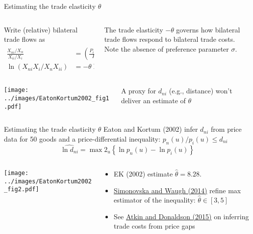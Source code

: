 \documentclass[11pt,notes=hide,aspectratio=169]{beamer}
\begin{document}
\begin{frame}{Estimating the trade elasticity $\theta$}
\begin{columns}
\begin{column}{.60\textwidth}
Write (relative) bilateral trade flows as
\begin{align*}
\frac{X_{ni}/X_{n}}{X_{ii}/X_{i}} 
&=
\left( \frac{P_{i}d_{ni}}{P_{n}}\right) ^{-\theta} \\
\ln \left(X_{ni}X_{i}/X_{n} X_{ii} \right)
&=
-\theta \ln P_{i}+\theta \ln P_{n}-\theta \ln d_{ni}
\end{align*}
\end{column}
\begin{column}{.38\textwidth}
The trade elasticity $-\theta$ governs how bilateral trade flows respond to bilateral trade costs.\\
Note the absence of preference parameter $\sigma$.
\end{column}
\end{columns}
\begin{columns}
\begin{column}{.60\textwidth}
\texttt{[image: ../images/EatonKortum2002\_fig1.pdf]}
\end{column}
\begin{column}{.38\textwidth}
A proxy for $d_{ni}$ (e.g., distance) won't deliver an estimate of $\theta$
\end{column}
\end{columns}
\end{frame}
\begin{frame}{Estimating the trade elasticity $\theta$}
Eaton and Kortum (2002) infer $d_{ni}$ from price data for 50 goods and a price-differential inequality:
$%
{p_{n}(u)} / {p_{i}(u)}\leq d_{ni} 
$%
\begin{equation*}
\widehat{\ln d_{ni}}
=
\max2_{u}\left\{ \ln p_{n}(u) -\ln p_{i}(u) \right\}
\end{equation*}
\begin{columns}
\begin{column}{.55\textwidth}
\texttt{[image: ../images/EatonKortum2002\_fig2.pdf]}
\end{column}
\begin{column}{.43\textwidth}
\begin{itemize}
\item EK (2002) estimate $\hat{\theta} =8.28$.
\item \href{https://ideas.repec.org/a/eee/inecon/v92y2014i1p34-50.html}{Simonovska and Waugh (2014)} refine max estimator of the inequality: $\hat{\theta} \in \left[3,5
\right]$
\item See \href{https://ideas.repec.org/p/nbr/nberwo/21439.html}{Atkin and Donaldson (2015)} on inferring trade costs from price gaps
\end{itemize}
\end{column}
\end{columns}
\end{frame}
\end{document}
